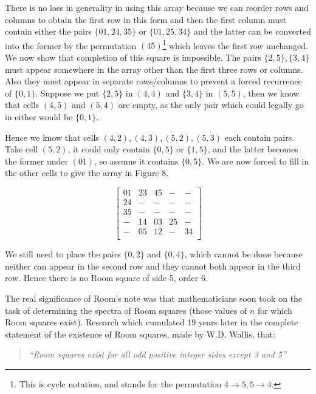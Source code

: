 \documentclass[
  11pt,
  a4paper]{book}
\begin{document}
There is no loss in generality in using this array because we can
reorder rows and columns to obtain the first row in this form and then
the first column must contain either the pairs \(\{01, 24, 35\}\) or
\(\{01, 25, 34\}\) and the latter can be converted into the former by the
permutation \((45)\)\footnote{This is cycle notation, and stands for the permutation
  \(4 \rightarrow 5, 5 \rightarrow 4\).} which leaves the first row unchanged. We now show
that completion of this square is impossible. The pairs
\(\{2,5\},\{3,4\}\) must appear somewhere in the array other than the
first three rows or columns. Also they must appear in separate
rows/columns to prevent a forced recurrence of \(\{0, 1\}\). Suppose we put
\(\{2, 5\}\) in \((4, 4)\) and \(\{3, 4\}\) in \((5, 5)\), then we know that cells
\((4, 5)\) and \((5, 4)\) are empty, as the only pair which could legally go
in either would be \(\{0, 1\}\).

Hence we know that cells \((4, 2), (4, 3), (5, 2), (5, 3)\) each contain pairs.
Take cell \((5, 2)\), it could only contain \(\{0, 5\}\) or \(\{1, 5\}\), and the
latter becomes the former under \((01)\), so assume it contains \(\{0, 5\}\).
We are now forced to fill in the other cells to give the array in Figure
8.

\begin{equation}
  \begin{bmatrix}
    01 & 23 & 45 &  - & -  \\
    24 &  - &  - &  - & -  \\
    35 &  - &  - &  - & -  \\
     - & 14 & 03 & 25 & -  \\
     - & 05 & 12 &  - & 34 \\
  \end{bmatrix}
\end{equation}

We still need to place the pairs \(\{0, 2\}\) and \(\{0, 4\}\), which cannot
be done because neither can appear in the second row and they cannot
both appear in the third row. Hence there is no Room square of side 5,
order 6.

The real significance of Room's note was that mathematicians soon took
on the task of determining the spectra of Room squares (those values of
\(n\) for which Room squares exist). Research which cumulated 19 years
later in the complete statement of the existence of Room squares, made
by W.D. Wallis, that:

\begin{quote}
\emph{``Room squares exist for all odd positive integer sides except 3
and 5''} \textcite{wallis_solution_1974}
\end{quote}
\end{document}
